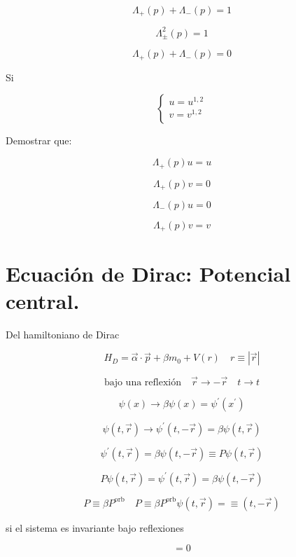\documentclass{report}
\begin{document}
\[ \Lambda_{+} (p) + \Lambda_{-} (p) = 1\]

\[ \Lambda_{\pm}^{2} (p)  = 1\]

\[ \Lambda_{+} (p) + \Lambda_{-} (p) = 0 \]

Si 

\[ 
  \begin{cases}
    u = u^{1,2}\\
    v = v^{1,2}\\
  \end{cases}
\]

Demostrar que:

\[\Lambda_{+}(p)u = u\]

\[\Lambda_{+}(p)v = 0\]

\[\Lambda_{-}(p)u = 0\]

\[\Lambda_{+}(p)v = v\]


\chapter{Ecuaci\'on de Dirac: Potencial central.}

Del hamiltoniano de Dirac

\[H_{D} = \overrightarrow{\alpha} \cdot \overrightarrow{p	} + \beta m_0 + V (r) \quad r \equiv |\overrightarrow{r}|\]

\[\text{bajo una reflexión} \quad \overrightarrow{r} \rightarrow - \overrightarrow{r} \quad t \rightarrow t\]

\[\psi (x) \rightarrow \beta \psi (x) = \psi ^{\prime} (x^{\prime})\]

\[\psi (t, \overrightarrow{r}) \rightarrow \psi ^{\prime} (t,-\overrightarrow{r}) = \beta \psi (t,\overrightarrow{r})\]

\[\psi ^{\prime} (t,\overrightarrow{r}) = \beta \psi (t,-\overrightarrow{r}) \equiv P \psi (t,\overrightarrow{r})\]

\[P \psi (t, \overrightarrow{r}) = \psi ^{\prime } (t,\overrightarrow{r}) = \beta \psi (t,-\overrightarrow{r})\]

\begin{equation}
P \equiv \beta P^{\text{orb}} \quad P \equiv \beta P^{\text{orb}} \psi (t,\overrightarrow{r}) = \equiv (t,- \overrightarrow{r})
\end{equation}

si el sistema es invariante bajo reflexiones 

\begin{equation}
[P, H_{D} ] = 0
\end{equation}
\end{document}
